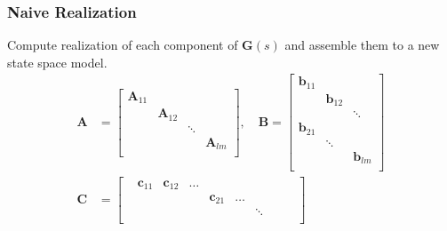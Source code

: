 \subsubsection{Naive Realization}
Compute realization of each component of $\mathbf{G}(s)$ and assemble them to a new state space model.
\begin{align*}
    \mathbf{A} & =\begin{bmatrix}
                      \mathbf{A}_{11} &                 &        &                 \\
                                      & \mathbf{A}_{12} &        &                 \\
                                      &                 & \ddots &                 \\
                                      &                 &        & \mathbf{A}_{lm} \\
                  \end{bmatrix},
    \quad \mathbf{B}  =\begin{bmatrix}
                           \mathbf{b}_{11} &                 &                 \\
                                           & \mathbf{b}_{12} &                 \\
                                           &                 & \ddots          \\
                           \mathbf{b}_{21} &                 &                 \\
                                           & \ddots          &                 \\
                                           &                 & \mathbf{b}_{lm} \\
                       \end{bmatrix}                                                                    \\
    \mathbf{C} & =\begin{bmatrix}
                       & \mathbf{c}_{11} & \mathbf{c}_{12} & \dots &                 &       &        &                 &       &                 \\
                       &                 &                 &       & \mathbf{c}_{21} & \dots &        &                 &       &                 \\
                       &                 &                 &       &                 &       & \ddots &                 &       &                 \\

\end{bmatrix}
\end{align*}

